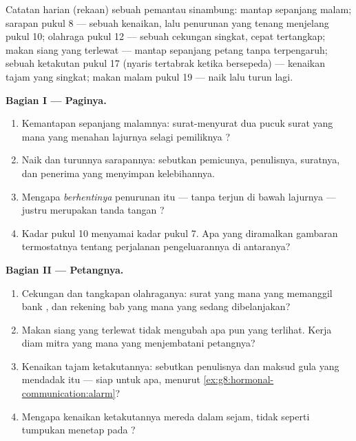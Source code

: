 \begin{problem}\label{pb:g8:hormonal-communication:1}
Catatan harian (rekaan) sebuah pemantau  sinambung:
mantap sepanjang malam; sarapan pukul 8 --- sebuah kenaikan,
lalu penurunan yang tenang menjelang pukul 10; olahraga
pukul 12 --- sebuah cekungan singkat, cepat tertangkap;
makan siang yang terlewat --- mantap sepanjang petang tanpa
terpengaruh; sebuah ketakutan pukul 17 (nyaris tertabrak
ketika bersepeda) --- kenaikan tajam yang singkat; makan
malam pukul 19 --- naik lalu turun lagi.

\medskip\noindent\textbf{Bagian I --- Paginya.}
\begin{enumerate}
  \item Kemantapan sepanjang malamnya: surat-menyurat dua
        pucuk surat yang mana yang menahan lajurnya selagi
        pemiliknya ?
  \item Naik dan turunnya sarapannya: sebutkan pemicunya,
        penulisnya, suratnya, dan penerima yang menyimpan
        kelebihannya.
  \item Mengapa \emph{berhentinya} penurunan itu --- tanpa
        terjun di bawah lajurnya --- justru merupakan tanda
        tangan ?
  \item Kadar pukul 10 menyamai kadar pukul 7. Apa yang
        diramalkan gambaran termostatnya tentang perjalanan
        pengeluarannya di antaranya?
\end{enumerate}

\medskip\noindent\textbf{Bagian II --- Petangnya.}
\begin{enumerate}[resume]
  \item Cekungan dan tangkapan olahraganya: surat yang mana
        yang memanggil bank , dan rekening bab yang
        mana yang sedang dibelanjakan?
  \item Makan siang yang terlewat tidak mengubah apa pun
        yang terlihat. Kerja diam  mitra yang mana
        yang menjembatani petangnya?
  \item Kenaikan tajam ketakutannya: sebutkan penulisnya dan
        maksud gula yang mendadak itu --- siap untuk apa,
        menurut \cref{ex:g8:hormonal-communication:alarm}?
  \item Mengapa kenaikan ketakutannya mereda dalam sejam,
        tidak seperti tumpukan menetap pada ?
\end{enumerate}


\end{problem}

